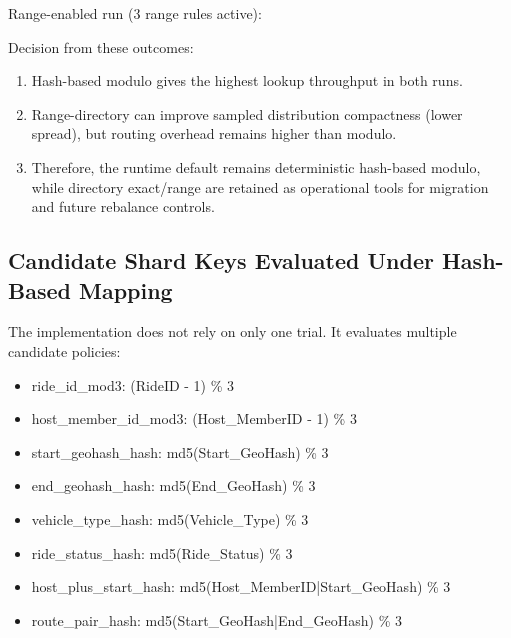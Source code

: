 \documentclass[12pt]{article}
\begin{document}
Range-enabled run (3 range rules active):

\begin{table}[H]
\centering
\begin{minipage}{\textwidth}
\centering
{}
\end{minipage}
\end{table}

Decision from these outcomes:
\begin{enumerate}
    \item Hash-based modulo gives the highest lookup throughput in both runs.
    \item Range-directory can improve sampled distribution compactness (lower spread), but routing overhead remains higher than modulo.
    \item Therefore, the runtime default remains deterministic hash-based modulo, while directory exact/range are retained as operational tools for migration and future rebalance controls.
\end{enumerate}

\subsection{Candidate Shard Keys Evaluated Under Hash-Based Mapping}

The implementation does not rely on only one trial. It evaluates multiple candidate policies:
\begin{itemize}
    \item ride\_id\_mod3: (RideID - 1) \% 3
    \item host\_member\_id\_mod3: (Host\_MemberID - 1) \% 3
    \item start\_geohash\_hash: md5(Start\_GeoHash) \% 3
    \item end\_geohash\_hash: md5(End\_GeoHash) \% 3
    \item vehicle\_type\_hash: md5(Vehicle\_Type) \% 3
    \item ride\_status\_hash: md5(Ride\_Status) \% 3
    \item host\_plus\_start\_hash: md5(Host\_MemberID|Start\_GeoHash) \% 3
    \item route\_pair\_hash: md5(Start\_GeoHash|End\_GeoHash) \% 3
\end{itemize}
\end{document}
